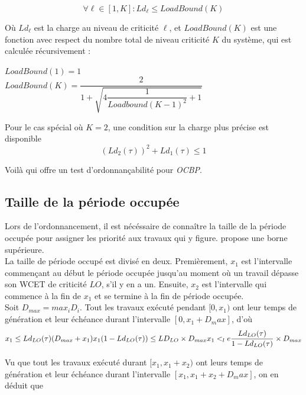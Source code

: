 \documentclass[12pt,a4paper,oneside]{book}
\theoremstyle{break}
\theoremstyle{breakplain}
\begin{document}
\begin{equation}
\label{test:ocbp}
\forall \ell \in [1,K] : Ld_\ell \le LoadBound(K)
\end{equation}

Où $Ld_\ell$ est la charge au niveau de criticité $\ell$, et $LoadBound(K)$ est une fonction avec respect du nombre total de niveau criticité $K$ du système, qui est calculée récursivement :
\begin{center}
$LoadBound(1) = 1$\\
$LoadBound(K) = \dfrac{2}{1+\sqrt{4\dfrac{1}{Loadbound(K-1)^2}+1}}$

\end{center}

Pour le cas spécial où $K = 2$, une condition sur la charge plus précise est disponible \cite{li2010load}
\begin{equation}
(Ld_2(\tau))^2+Ld_1(\tau) \le 1
\end{equation}

Voilà qui offre un test d'ordonnançabilité pour \textit{OCBP}.

\subsection{Taille de la période occupée}

Lors de l'ordonnancement, il est nécéssaire de connaître la taille de la période occupée pour assigner les priorité aux travaux qui y figure. \cite{li2010algorithm} propose une borne supérieure.\\

La taille de période occupé est divisé en deux. Premièrement, $x_1$ est l'intervalle commençant au début le période occupée jusqu'au moment où un travail dépasse son WCET de criticité $LO$, s'il y en a un. Ensuite, $x_2$ est l'intervalle qui commence à la fin de $x_1$ et se termine à la fin de période occupée.\\

Soit $D_{max} = max_i D_i$. Tout les travaux exécuté pendant $[0, x_1)$ ont leur temps de génération et leur échéance durant l'intervalle $[0, x_1+D_max]$, d'où
\begin{equation}
x_1 \le Ld_{LO}(\tau)(D_{max}+x_1)$$
$$x_1(1-Ld_{LO}(\tau))\le LD_{LO} \times D_{max}$$
$$x_1 <_le \dfrac{Ld_{LO}(\tau)}{1-Ld_{LO}(\tau)} \times D_{max}
\end{equation}

Vu que tout les travaux exécuté durant $[x_1, x_1+x_2)$ ont leurs temps de génération et leur échéance durant l'intervalle $[x_1, x_1+x_2+D_max]$, on en déduit que
\end{document}

